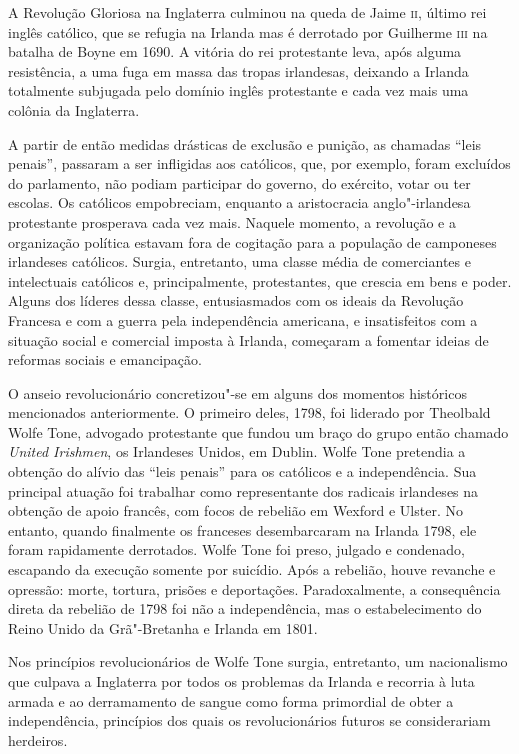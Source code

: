 A Revolução Gloriosa na Inglaterra culminou na queda de Jaime \textsc{ii}, último
rei inglês católico, que se refugia na Irlanda mas é derrotado por
Guilherme \textsc{iii} na batalha de Boyne em 1690. A vitória do rei protestante
leva, após alguma resistência, a uma fuga em massa das tropas
irlandesas, deixando a Irlanda totalmente subjugada pelo domínio inglês
protestante e cada vez mais uma colônia da Inglaterra.

A partir de então medidas drásticas de exclusão e punição, as chamadas
“leis penais”, passaram a ser infligidas aos católicos, que, por
exemplo, foram excluídos do parlamento, não podiam participar do
governo, do exército, votar ou ter escolas. Os católicos empobreciam,
enquanto a aristocracia anglo"-irlandesa protestante prosperava cada vez
mais. Naquele momento, a revolução e a organização política estavam
fora de cogitação para a população de camponeses irlandeses católicos.
Surgia, entretanto, uma classe média de comerciantes e intelectuais
católicos e, principalmente, protestantes, que crescia em bens e poder.
Alguns dos líderes dessa classe, entusiasmados com os ideais da
Revolução Francesa e com a guerra pela independência americana, e
insatisfeitos com a situação social e comercial imposta à Irlanda,
começaram a fomentar ideias de reformas sociais e emancipação. 

O anseio revolucionário concretizou"-se em alguns dos momentos históricos
mencionados anteriormente. O primeiro deles, 1798, foi liderado por
Theolbald Wolfe Tone, advogado protestante que fundou um braço do grupo
então chamado \textit{United Irishmen}, os Irlandeses Unidos,
em Dublin. Wolfe Tone pretendia a obtenção do alívio das “leis penais”
para os católicos e a independência. Sua principal atuação foi
trabalhar como representante dos radicais irlandeses na obtenção de
apoio francês, com focos de rebelião em Wexford e Ulster. No entanto,
quando finalmente os franceses desembarcaram na Irlanda 1798, ele foram
rapidamente derrotados. Wolfe Tone foi preso, julgado e condenado,
escapando da execução somente por suicídio. Após a rebelião, houve
revanche e opressão: morte, tortura, prisões e deportações.
Paradoxalmente, a consequência direta da rebelião de 1798 foi não a
independência, mas o estabelecimento do Reino Unido da Grã"-Bretanha e
Irlanda em 1801.  

Nos princípios revolucionários de Wolfe Tone surgia, entretanto, um
nacionalismo que culpava a Inglaterra por todos os problemas da Irlanda
e recorria à luta armada e ao derramamento de sangue como forma
primordial de obter a independência, princípios dos quais os
revolucionários futuros se considerariam herdeiros. 

